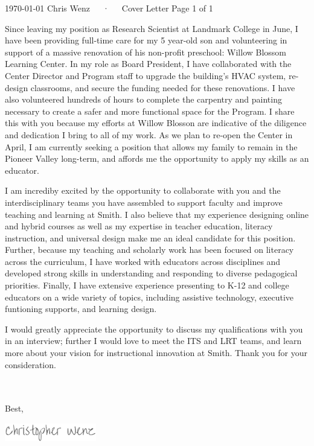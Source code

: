 \documentclass[11pt, a4paper]{awesome-cv}
\begin{document}
\makecvheader[C]

\makecvfooter
  {\today}
  {Chris Wenz~~~·~~~Cover Letter}
  {Page 1 of 1}

\makelettertitle

\begin{cvletter}

Since leaving my position as Research Scientist at Landmark College in June, I have been providing full-time care for my 5 year-old son and volunteering in support of a massive renovation of his non-profit preschool: Willow Blossom Learning Center. In my role as Board President, I have collaborated with the Center Director and Program staff to upgrade the building's HVAC system, re-design classrooms, and secure the funding needed for these renovations. I have also volunteered hundreds of hours to complete the carpentry and painting necessary to create a safer and more functional space for the Program. I share this with you because my efforts at Willow Blosson are indicative of the diligence and dedication I bring to all of my work. As we plan to re-open the Center in April, I am currently seeking a position that allows my family to remain in the Pioneer Valley long-term, and affords me the opportunity to apply my skills as an educator. 

I am incrediby excited by the opportunity to collaborate with you and the interdisciplinary teams you have assembled to support faculty and improve teaching and learning at Smith. I also believe that my experience designing online and hybrid courses as well as my expertise in teacher education, literacy instruction, and universal design make me an ideal candidate for this position. Further, because my teaching and scholarly work has been focused on literacy across the curriculum, I have worked with educators across disciplines and developed strong skills in understanding and responding to diverse pedagogical priorities. Finally, I have extensive experience presenting to K-12 and college educators on a wide variety of topics, including assistive technology, executive funtioning supports, and learning design. 

I would greatly appreciate the opportunity to discuss my qualifications with you in an interview; further I would love to meet the ITS and LRT teams, and learn more about your vision for instructional innovation at Smith. Thank you for your consideration.  


\\\\
Best,
\end{cvletter}



\includegraphics[width=4cm, height=0.8cm]{./img/sig.png}
\end{document}
